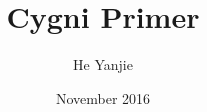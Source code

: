 \documentclass[a4paper,12pt]{book}
\begin{document}
\author{He Yanjie}
\title{Cygni Primer}
\date{November 2016}

\frontmatter
\maketitle
\tableofcontents

\mainmatter







\backmatter
\end{document}
